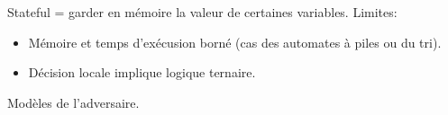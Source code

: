 Stateful = garder en mémoire la valeur de certaines variables.
Limites:
\begin{itemize}
    \item Mémoire et temps d'exécusion borné (cas des automates à piles ou du tri).
    \item Décision locale implique logique ternaire.
\end{itemize}

Modèles de l'adversaire.
